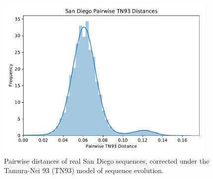 \documentclass[a4paper,11pt]{article}
\begin{document}
\begin{figure}[!h]
\centering
\includegraphics[width=0.95\textwidth]{figs/sd.tn93.real.pdf}
\caption{{Pairwise distances of real San Diego sequences, corrected under the Tamura-Nei 93 (TN93) model of sequence evolution.}}
\label{fig:sd-real-tn93}
\end{figure}

\clearpage
\end{document}
